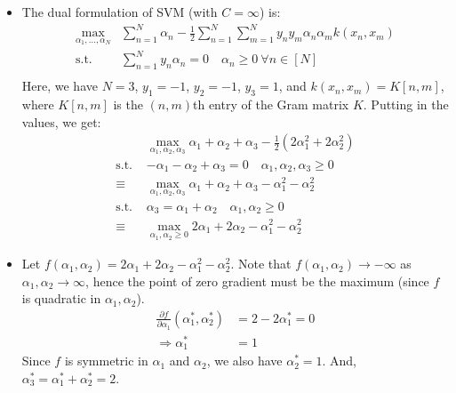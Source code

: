 \documentclass{article}
\begin{document}
\begin{itemize}
    \item[\textbf{3.3}] The dual formulation of SVM (with $C = \infty$) is:
    \begin{align*}
      \max_{\alpha_1, \ldots, \alpha_N} &\sum_{n=1}^N \alpha_n - \frac{1}{2} \sum_{n=1}^N \sum_{m=1}^N y_n y_m \alpha_n \alpha_m k(x_n, x_m) \\
      \text{s.t. } &\sum_{n=1}^N y_n \alpha_n = 0 \quad \alpha_n \ge 0 ~\forall n \in [N] \\
    \end{align*}
    Here, we have $N = 3$, $y_1 = -1$, $y_2 = -1$, $y_3 = 1$, and $k(x_n, x_m) = K[n, m]$, where $K[n, m]$ is the $(n, m)$th entry of the Gram matrix $K$.
    Putting in the values, we get:
    \begin{align*}
      &\max_{\alpha_1, \alpha_2, \alpha_3} \alpha_1 + \alpha_2 + \alpha_3 - \frac{1}{2} (2\alpha_1^2 + 2\alpha_2^2) \\
      \text{s.t. } &-\alpha_1 - \alpha_2 + \alpha_3 = 0 \quad \alpha_1, \alpha_2, \alpha_3 \ge 0 \\
      \equiv &\max_{\alpha_1, \alpha_2, \alpha_3} \alpha_1 + \alpha_2 + \alpha_3 - \alpha_1^2 - \alpha_2^2 \\
      \text{s.t. } &\alpha_3 = \alpha_1 + \alpha_2 \quad \alpha_1, \alpha_2 \ge 0 \\
      \equiv &\max_{\alpha_1, \alpha_2 \ge 0} 2\alpha_1 + 2\alpha_2 - \alpha_1^2 - \alpha_2^2
    \end{align*}

    \item[\textbf{3.4}] Let $f(\alpha_1, \alpha_2) = 2\alpha_1 + 2\alpha_2 - \alpha_1^2 - \alpha_2^2$.
    Note that $f(\alpha_1, \alpha_2) \to -\infty$ as $\alpha_1, \alpha_2 \to \infty$, hence the point of zero gradient must be the maximum (since $f$ is quadratic in $\alpha_1, \alpha_2$).
    \begin{align*}
      \frac{\partial f}{\partial \alpha_1}(\alpha_1^*, \alpha_2^*) &= 2 - 2\alpha_1^* = 0 \\
      \Rightarrow \alpha_1^* &= 1
    \end{align*}
    Since $f$ is symmetric in $\alpha_1$ and $\alpha_2$, we also have $\alpha_2^* = 1$.
    And, $\alpha_3^* = \alpha_1^* + \alpha_2^* = 2$.


\end{itemize}
\end{document}
